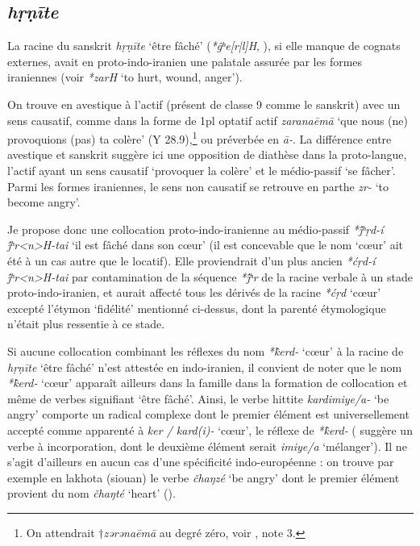 \documentclass{article}
\newcommand{\ipa}[1]{{\phon\textit{#1}}}
\begin{document}

\subsection{\ipa{hṛṇīte}} \label{sec:hrnite}
La racine du sanskrit \ipa{hṛṇīte} `être fâché' (\ipa{*ĝʰe[r|l]H}, \citealt[178]{liv}), si elle manque de cognats externes, avait en proto-indo-iranien une palatale assurée par les formes iraniennes (voir \citealt[469]{cheung07dictionary} \ipa{*zarH} ‘to hurt, wound, anger’). 

On trouve en avestique à l'actif (présent de classe 9 comme le sanskrit) avec un sens causatif, comme dans la forme de 1pl optatif actif \ipa{zaranaēmā} `que nous (ne) provoquions (pas) ta colère' (Y 28.9),\footnote{On attendrait $\dagger$\ipa{zərənaēmā} au degré zéro, voir \citet[178]{liv}, note 3.  } ou préverbée en \ipa{ā-}. La différence entre avestique et sanskrit suggère ici une opposition de diathèse dans la proto-langue, l'actif ayant un sens causatif `provoquer la colère' et le médio-passif `se fâcher'. Parmi les formes iraniennes, le sens non causatif se retrouve en parthe \ipa{zr-} `to become angry'.

Je propose donc une collocation proto-indo-iranienne au médio-passif \ipa{*j́ʰṛd-í j́ʰr<n>H-tai} `il est fâché dans son cœur' (il est concevable que le nom `cœur' ait été à un cas autre que le locatif).  Elle proviendrait d'un plus ancien \ipa{*ćṛd-í j́ʰr<n>H-tai} par contamination de la séquence \ipa{*j́ʰr} de la racine verbale à un stade proto-indo-iranien, et aurait affecté tous les dérivés de la racine \ipa{*ćṛd} `cœur' excepté l'étymon `fidélité' mentionné ci-dessus, dont la parenté étymologique n'était plus ressentie à ce stade.

Si aucune collocation combinant les réflexes du nom \ipa{*k̂erd-} `cœur' à la racine de \ipa{hṛṇīte} `être fâché' n'est attestée en indo-iranien, il convient de noter que  le nom \ipa{*k̂erd-} `cœur' apparaît ailleurs dans la famille dans  la formation de collocation et même de verbes signifiant `être fâché'. Ainsi, le verbe hittite  \ipa{kardimiye/a-} `be angry' comporte un radical complexe dont le premier élément est universellement accepté comme apparenté à \ipa{ker / kard(i)-} `cœur', le réflexe de \ipa{*k̂erd-} (\citealt[456-7]{kloekhorst08edhil} suggère un verbe à incorporation, dont le deuxième élément serait \ipa{imiye/a} `mélanger'). Il ne s'agit d'ailleurs en aucun cas d'une spécificité indo-européenne : on trouve par exemple en lakhota (siouan) le verbe  \ipa{čhaŋzé} `be angry' dont le premier élément provient du nom \ipa{čhaŋté} `heart' (\citealt{ullrich08}).
\end{document}
